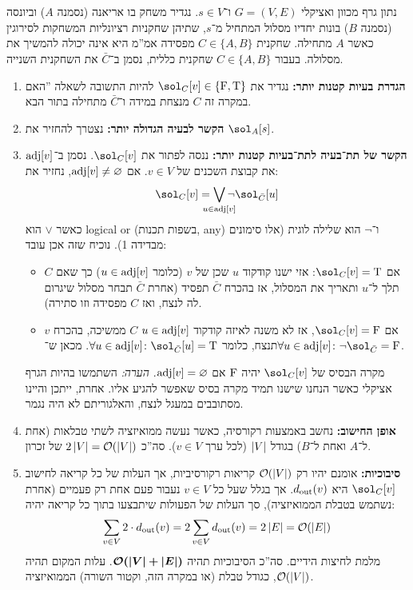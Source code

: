 \documentclass[]{../../../../tex/classes/homework}
\begin{document}
\npage%
	
\section{}%
	נתון גרף מכוון ואציקלי $G = (V, E)$ ו־$s \in V$. נגדיר משחק בו אריאנה (נסמנה $A$) וביונסה (נסמנה $B$) בונות יחדיו מסלול המתחיל מ־$s$, שתיהן שחקניות רציונליות המשחקות לסירוגין כאשר $A$ מתחילה. שחקנית $C \in \{A, B\}$ מפסידה אמ''מ היא אינה יכולה להמשיך את מסלולה. בעבור $C \in \{A, B\}$ שחקנית כללית, נסמן ב־$\bar C$ את השחקנית השנייה. 
	\begin{enumerate}
		\item \textbf{הגדרת בעיות קטנות יותר: }נגדיר את $\sol_C[v] \in \{\false, \true\}$ להיות התשובה לשאלה ''האם במקרה זה $C$ מנצחת במידה ו־$\bar C$ מתחילה בתור הבא. 
		\item \textbf{הקשר לבעיה הגדולה יותר: }נצטרך להחזיר את $\sol_A[s]$. 
		\item \textbf{הקשר של תת־בעיה לתת־בעיות קטנות יותר: }ננסה לפתור את $\sol_C[v]$. נסמן ב־$\operatorname{adj}[v]$ את קבוצת השכנים של $v \in V$. אם $\operatorname{adj}[v] \neq \varnothing$, 	נחזיר את: 
		\[ \sol_C[v] = \bigvee_{\mathclap{u \in \adj[v]}} \lnot \sol_{\bar C}[u] \]
		כאשר $\lor$ הוא logical or (בשפות תכנות, any) ו־$\lnot$ הוא שלילה לוגית (אלו סימונים מבדידה 1). נוכיח שזה אכן עובד: 
		\begin{itemize}
			\item אם $\sol_C[v] = \true$: אזי ישנו קודקוד $u$ שכן של $v$ (כלומר $u \in \operatorname{adj}[v]$) כך שאם $C$ תלך ל־$u$ ותאריך את המסלול, אז בהכרח $\bar C$ תפסיד (אחרת $\bar C$ תבחר מסלול שיגרום לה לנצח, ואז $C$ מפסידה וזו סתירה). 
			\item אם $\sol_C[v] = \false$, אז לא משנה לאיזה קודקוד $u \in \operatorname{adj}[v]$ $C$ ממשיכה, בהכרח $v$ תנצח, כלומר $\forall u \in \adj[v] \co \sol_{\bar C}[u] = \true$. מכאן ש־$\forall u \in \adj[v] \co \lnot \sol_{\bar C} = \false$. 
		\end{itemize}
		
		מקרה הבסיס של $\sol_C[v]$ יהיה $\mathrm{F}$ אם $\operatorname{adj}[v] = \varnothing$. 
		\textit{הערה: }השתמשו בהיות הגרף אציקלי כאשר הנחנו שישנו תמיד מקרה בסיס שאפשר להגיע אליו. אחרת, ייתכן והיינו מסתובבים במעגל לנצח, והאלגוריתם לא היה נגמר. 
		\item \textbf{אופן החישוב: }נחשב באמצעות רקורסיה, כאשר נעשה ממואיזציה לשתי טבלאות (אחת ל־$A$ ואחת ל־$B$) בגודל $\left \lvert V \right \rvert$ (לכל ערך $v \in V$). סה''כ $2 \left \lvert V \right \rvert = \mathcal{O}(\left \lvert V \right \rvert)$ של זכרון. 
		\item \textbf{סיבוכיות: }אומנם יהיו רק $\mathcal{O}(\left \lvert V \right \rvert)$ קריאות רקורסיביות, אך העלות של כל קריאה לחישוב $\sol_C[v]$ היא $d_{\mathrm{out}}(v)$. אך בגלל שעל כל $v \in V$ נעבור פעם אחת רק פעמיים (אחרת נשתמש בטבלת הממואיזציה), סך העלות של הפעולות שיתבצעו בתוך כל קריאה יהיה: 
		\[ \sum_{v \in V}2 \cdot d_{\mathrm{out}}(v) = 2 \sum_{v \in V}d_{\mathrm{out}}(v) = 2 \left \lvert E \right \rvert = \mathcal{O}(\left \lvert E \right \rvert) \]
		מלמת לחיצות הידיים. סה''כ הסיבוכיות תהיה $\bm{\mathcal{O}(\left \lvert V \right \rvert + \left \lvert E \right \rvert)}$. עלות המקום תהיה $\mathcal{O}(\left \lvert V \right \rvert)$, כגודל טבלת (או במקרה הזה, וקטור השורה) הממואיזציה. 
	\end{enumerate}
\npage%
	
\end{document}
